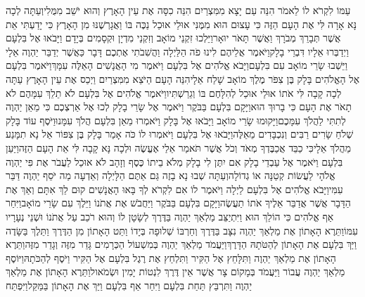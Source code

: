 \documentclass[../main/main.tex]{subfiles}
\begin{document}
\begin{multicols}{\ncols}
עַמּוֹ לִקְרֹא לוֹ לֵאמֹר הִנֵּה עַם יָצָא מִמִּצְרַיִם הִנֵּה כִסָּה אֶת עֵין הָאָרֶץ וְהוּא יֹשֵׁב מִמֻּלִי\PreVerseSpace{}וְעַתָּה לְכָה נָּא אָרָה לִּי אֶת הָעָם הַזֶּה כִּי עָצוּם הוּא מִמֶּנִּי אוּלַי אוּכַל נַכֶּה בּוֹ וַאֲגָרְשֶׁנּוּ מִן הָאָרֶץ כִּי יָדַעְתִּי אֵת אֲשֶׁר תְּבָרֵךְ מְבֹרָךְ וַאֲשֶׁר תָּאֹר יוּאָר\PreVerseSpace{}וַיֵּלְכוּ זִקְנֵי מוֹאָב וְזִקְנֵי מִדְיָן וּקְסָמִים בְּיָדָם וַיָּבֹאוּ אֶל בִּלְעָם וַיְדַבְּרוּ אֵלָיו דִּבְרֵי בָלָק\PreVerseSpace{}וַיֹּאמֶר אֲלֵיהֶם לִינוּ פֹה הַלַּיְלָה וַהֲשִׁבֹתִי אֶתְכֶם דָּבָר כַּאֲשֶׁר יְדַבֵּר יַהְוֶה אֵלָי וַיֵּשְׁבוּ שָׂרֵי מוֹאָב עִם בִּלְעָם\PreVerseSpace{}וַיָּבֹא אֱלֹהִים אֶל בִּלְעָם וַיֹּאמֶר מִי הָאֲנָשִׁים הָאֵלֶּה עִמָּךְ\PreVerseSpace{}וַיֹּאמֶר בִּלְעָם אֶל הָאֱלֹהִים בָּלָק בֶּן צִפֹּר מֶלֶךְ מוֹאָב שָׁלַח אֵלָי\PreVerseSpace{}הִנֵּה הָעָם הַיֹּצֵא מִמִּצְרַיִם וַיְכַס אֶת עֵין הָאָרֶץ עַתָּה לְכָה קָבָה לִּי אֹתוֹ אוּלַי אוּכַל לְהִלָּחֶם בּוֹ וְגֵרַשְׁתִּיו\PreVerseSpace{}וַיֹּאמֶר אֱלֹהִים אֶל בִּלְעָם לֹא תֵלֵךְ עִמָּהֶם לֹא תָאֹר אֶת הָעָם כִּי בָרוּךְ הוּא\PreVerseSpace{}וַיָּקָם בִּלְעָם בַּבֹּקֶר וַיֹּאמֶר אֶל שָׂרֵי בָלָק לְכוּ אֶל אַרְצְכֶם כִּי מֵאֵן יַהְוֶה לְתִתִּי לַהֲלֹךְ עִמָּכֶם\PreVerseSpace{}וַיָּקוּמוּ שָׂרֵי מוֹאָב וַיָּבֹאוּ אֶל בָּלָק וַיֹּאמְרוּ מֵאֵן בִּלְעָם הֲלֹךְ עִמָּנוּ\PreVerseSpace{}וַיֹּסֶף עוֹד בָּלָק שְׁלֹחַ שָׂרִים רַבִּים וְנִכְבָּדִים מֵאֵלֶּה\PreVerseSpace{}וַיָּבֹאוּ אֶל בִּלְעָם וַיֹּאמְרוּ לוֹ כֹּה אָמַר בָּלָק בֶּן צִפּוֹר אַל נָא תִמָּנַע מֵהֲלֹךְ אֵלָי\PreVerseSpace{}כִּי כַבֵּד אֲכַבֶּדְךָ מְאֹד וְכֹל אֲשֶׁר תֹּאמַר אֵלַי אֶעֱשֶׂה וּלְכָה נָּא קָבָה לִּי אֵת הָעָם הַזֶּה\PreVerseSpace{}וַיַּעַן בִּלְעָם וַיֹּאמֶר אֶל עַבְדֵי בָלָק אִם יִתֶּן לִי בָלָק מְלֹא בֵיתוֹ כֶּסֶף וְזָהָב לֹא אוּכַל לַעֲבֹר אֶת פִּי יַהְוֶה אֱלֹהָי לַעֲשׂוֹת קְטַנָּה אוֹ גְדוֹלָה\PreVerseSpace{}וְעַתָּה שְׁבוּ נָא בָזֶה גַּם אַתֶּם הַלָּיְלָה וְאֵדְעָה מַה יֹּסֵף יַהְוֶה דַּבֵּר עִמִּי\PreVerseSpace{}וַיָּבֹא אֱלֹהִים אֶל בִּלְעָם לַיְלָה וַיֹּאמֶר לוֹ אִם לִקְרֹא לְךָ בָּאוּ הָאֲנָשִׁים קוּם לֵךְ אִתָּם וְאַךְ אֶת הַדָּבָר אֲשֶׁר אֲדַבֵּר אֵלֶיךָ אֹתוֹ תַעֲשֶׂה\PreVerseSpace{}וַיָּקָם בִּלְעָם בַּבֹּקֶר וַיַּחֲבֹשׁ אֶת אֲתֹנוֹ וַיֵּלֶךְ עִם שָׂרֵי מוֹאָב\PreVerseSpace{}וַיִּחַר אַף אֱלֹהִים כִּי הוֹלֵךְ הוּא וַיִּתְיַצֵּב מַלְאַךְ יַהְוֶה בַּדֶּרֶךְ לְשָׂטָן לוֹ וְהוּא רֹכֵב עַל אֲתֹנוֹ וּשְׁנֵי נְעָרָיו עִמּוֹ\PreVerseSpace{}וַתֵּרֶא הָאָתוֹן אֶת מַלְאַךְ יַהְוֶה נִצָּב בַּדֶּרֶךְ וְחַרְבּוֹ שְׁלוּפָה בְּיָדוֹ וַתֵּט הָאָתוֹן מִן הַדֶּרֶךְ וַתֵּלֶךְ בַּשָּׂדֶה וַיַּךְ בִּלְעָם אֶת הָאָתוֹן לְהַטֹּתָהּ הַדָּרֶךְ\PreVerseSpace{}וַיַּעֲמֹד מַלְאַךְ יַהְוֶה בְּמִשְׁעוֹל הַכְּרָמִים גָּדֵר מִזֶּה וְגָדֵר מִזֶּה\PreVerseSpace{}וַתֵּרֶא הָאָתוֹן אֶת מַלְאַךְ יַהְוֶה וַתִּלָּחֵץ אֶל הַקִּיר וַתִּלְחַץ אֶת רֶגֶל בִּלְעָם אֶל הַקִּיר וַיֹּסֶף לְהַכֹּתָהּ\PreVerseSpace{}וַיּוֹסֶף מַלְאַךְ יַהְוֶה עֲבוֹר וַיַּעֲמֹד בְּמָקוֹם צָר אֲשֶׁר אֵין דֶּרֶךְ לִנְטוֹת יָמִין וּשְׂמֹאול\PreVerseSpace{}וַתֵּרֶא הָאָתוֹן אֶת מַלְאַךְ יַהְוֶה וַתִּרְבַּץ תַּחַת בִּלְעָם וַיִּחַר אַף בִּלְעָם וַיַּךְ אֶת הָאָתוֹן בַּמַּקֵּל\PreVerseSpace{}וַיִּפְתַּח 
\end{multicols}
\end{document}
